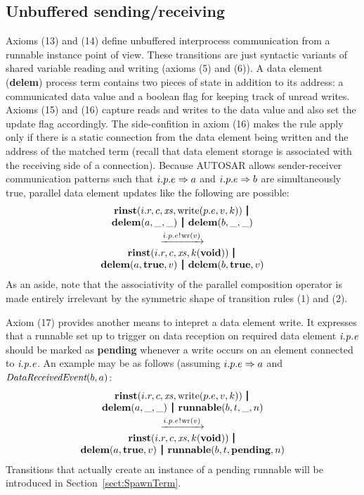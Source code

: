 \documentclass[twocolumn]{article}
\begin{document}
\subsection{Unbuffered sending/receiving}

Axioms (13) and (14) define unbuffered interprocess communication from a runnable instance point of view. These transitions are just syntactic variants of shared variable reading and writing (axioms (5) and (6)). A data element ({\bf delem}) process term contains two pieces of state in addition to its address: a communicated data value and a boolean flag for keeping track of unread writes. Axioms (15) and (16) capture reads and writes to the data value and also set the update flag accordingly. The side-confition in axiom (16) makes the rule apply only if there is a static connection from the data element being written and the address of the matched term (recall that data element storage is associated with the receiving side of a connection). Because AUTOSAR allows sender-receiver communication patterns such that $\Tconnect {i.p.e} a$ and $\Tconnect {i.p.e} b$ are simultaneously true, parallel data element updates like the following are possible:
$$
\begin{array}{c}
	\Trinst {i.r} c \Xs {\TrteWrite {p.e} v k} \,\Opar  \\
	{\Tdelem a \_ \_} \Opar {\Tdelem b \_ \_} \vspace{0.6ex} \\
	\red{\say{i.p.e}{\Twr v}} \\
	\Trinst {i.r} c \Xs {\Tap k \Tvoid} \,\Opar \\
	{\Tdelem a \Ttrue v} \Opar {\Tdelem b \Ttrue v}
\end{array}
$$
As an aside, note that the associativity of the parallel composition operator is made entirely irrelevant by the symmetric shape of transition rules (1) and (2).

Axiom (17) provides another means to intepret a data element write. It expresses that a runnable set up to trigger on data reception on required data element $\Tep e p i$ should be marked as {\bf pending} whenever a write occurs on an element connected to $\Tep e p i$. An example may be as follows (assuming $\Tconnect {i.p.e} a$ and $\TdataReceivedEvent b a$:
$$
\begin{array}{c}
	\Trinst {i.r} c \Xs {\TrteWrite {p.e} v k} \,\Opar  \\
	{\Tdelem a \_ \_} \Opar {\Trunnable b t \_ n} \vspace{0.6ex} \\
	\red{\say{i.p.e}{\Twr v}} \\
	\Trinst {i.r} c \Xs {\Tap k \Tvoid} \,\Opar \\
	{\Tdelem a \Ttrue v} \Opar {\Trunnable b t \Tpending n}
\end{array}
$$
Transitions that actually create an instance of a pending runnable will be introduced in Section~\ref{sect:SpawnTerm}.
\end{document}

